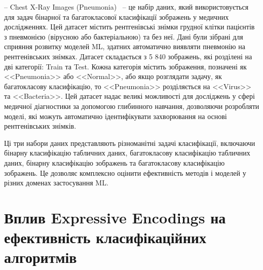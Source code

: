 -- Chest X-Ray Images (Pneumonia)~\cite{ct32} -- це набір даних, який використовується для задач бінарної та багатокласової класифікації зображень у медичних дослідженнях. Цей датасет містить рентгенівські знімки грудної клітки пацієнтів з пневмонією (вірусною або бактеріальною) та без неї. Дані були зібрані для сприяння розвитку моделей ML, здатних автоматично виявляти пневмонію на рентгенівських знімках. Датасет складається з 5 840 зображень, які розділені на дві категорії: Train та Test. Кожна категорія містить зображення, позначені як <<Pneumonia>> або <<Normal>>, або якщо розглядати задачу, як багатокласову класифікацію, то <<Pneumonia>> розділяється на <<Virus>> та <<Bacteria>>. Цей датасет надає великі можливості для досліджень у сфері медичної діагностики за допомогою глибинного навчання, дозволяючи розробляти моделі, які можуть автоматично ідентифікувати захворювання на основі рентгенівських знімків.

Ці три набори даних представляють різноманітні задачі класифікації, включаючи бінарну класифікацію табличних даних, багатокласову класифікацію табличних даних, бінарну класифікацію зображень та багатокласову класифікацію зображень. Це дозволяє комплексно оцінити ефективність методів і моделей у різних доменах застосування ML.

\section{Вплив Expressive Encodings на ефективність класифікаційних алгоритмів}


